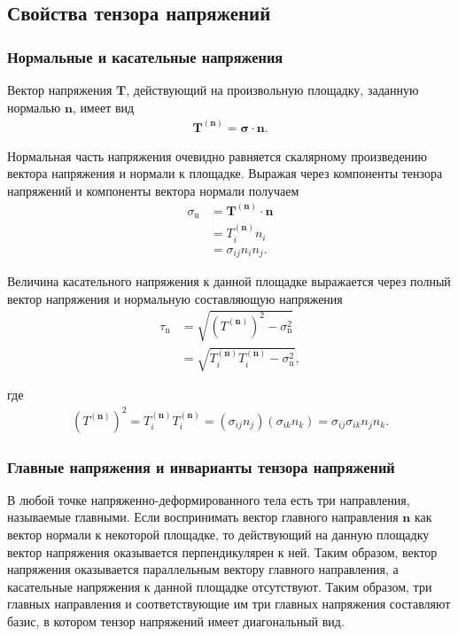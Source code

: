 \clearpage
\newpage

\subsection{Свойства тензора напряжений}

\subsubsection{Нормальные и касательные напряжения}

Вектор напряжения $\mathbf{T}$, действующий на произвольную площадку, заданную нормалью $\mathbf n$, имеет вид
\begin{eqnarray}
\mathbf{T}^{(\mathbf n)}= \boldsymbol{\sigma}\cdot\mathbf n.
\end{eqnarray}

Нормальная часть напряжения очевидно равняется скалярному произведению вектора напряжения и нормали к площадке. Выражая через компоненты тензора напряжений и компоненты вектора нормали получаем
\begin{eqnarray}
\sigma_\mathrm{n} &= \mathbf{T}^{(\mathbf{n})}\cdot \mathbf{n} \\
&=T^{(\mathbf n)}_i n_i \\
&=\sigma_{ij}n_i n_j.
\end{eqnarray}

Величина касательного напряжения к данной площадке выражается через полный вектор напряжения и нормальную составляющую напряжения
\begin{eqnarray}
\tau_\mathrm{n} &=\sqrt{ \left( T^{(\mathbf n)} \right)^2-\sigma_\mathrm{n}^2} \\
&= \sqrt{T_i^{(\mathbf n)}T_i^{(\mathbf n)}-\sigma_\mathrm{n}^2},
\end{eqnarray}

где
\begin{eqnarray}
\left( T^{(\mathbf n)} \right)^2 = T_i^{(\mathbf n)} T_i^{(\mathbf n)} = \left( \sigma_{ij} n_j \right) \left(\sigma_{ik} n_k \right) = \sigma_{ij} \sigma_{ik} n_j n_k.
\end{eqnarray}


\subsubsection{Главные напряжения и инварианты тензора напряжений}

В любой точке напряженно-деформированного тела есть три направления, называемые главными. Если воспринимать вектор главного направления $\mathbf{n}$ как вектор нормали к некоторой площадке, то действующий на данную площадку вектор напряжения оказывается перпендикулярен к ней. Таким образом, вектор напряжения оказывается параллельным вектору главного направления, а касательные напряжения к данной площадке отсутствуют. Таким образом, три главных направления и соответствующие им три главных напряжения составляют базис, в котором тензор напряжений имеет диагональный вид.

